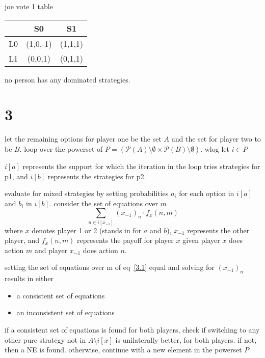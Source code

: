 \documentclass{article}
\begin{document}
joe vote 1 table
\begin{table}[h!]
\centering
\begin{tabular}{c|c c}
\toprule
 & S0 & S1 \\
\midrule
L0 & (1,0,-1) & (1,1,1) \\
L1 & (0,0,1) & (0,1,1) \\
\bottomrule
\end{tabular}

\end{table}



no person has any dominated strategies.




\newpage
\section{3}





let the remaining options for player one be the set \(A\) and the set for player two to be \(B\). loop over the powerset of \(P=(\mathcal{P}(A)\setminus\emptyset\times \mathcal{P}(B)\setminus\emptyset)\). wlog let \(i\in P\)

\(i[a]\) represents the support for which the iteration in the loop tries strategies for p1, and \(i[b]\) represents the strategies for p2.

evaluate for mixed strategies by setting probabilities \(a_i\) for each option in \(i[a]\) and \(b_i\) in \(i[b]\). consider the set of equations over \(m\)
\begin{equation}\label{3.1}
    \sum_{n\in i[x_{-1}]} (x_{-1})_{n}\cdot f_x(n,m)
\end{equation}
where \(x\) denotes player 1 or 2 (stands in for \(a\) and \(b\)), \(x_{-1}\) represents the other player, and \(f_x(n,m)\)  represents the payoff for player \(x\) given player \(x\) does action \(m\) and player \(x_{-1}\) does action \(n\). 

setting the set of equations over m of eq~\ref{3.1} equal and solving for \((x_{-1})_n\) results in either
\begin{itemize}
    \item a consistent set of equations
    \item an inconsistent set of equations
\end{itemize}

if a consistent set of equations is found for both players, check if switching to any other pure strategy not in \(A\setminus i[x]\) is unilaterally better, for both players. if not, then a NE is found. otherwise, continue with a new element in the powerset \(P\)
\end{document}
